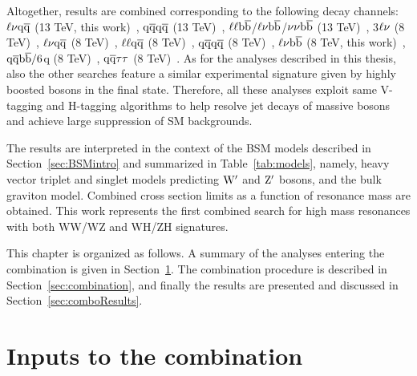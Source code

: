 Altogether, results are combined corresponding to the following decay channels: $\ell \nu \mathrm{q}\overline{\mathrm{q}}$ (13 TeV, this work)~\cite{CMS-PAS-EXO-15-002}, $\mathrm{q}\overline{\mathrm{q}} \mathrm{q}\overline{\mathrm{q}}$ (13 TeV)~\cite{CMS-PAS-EXO-15-002},
$\ell \ell {\mathrm{b}\overline{\mathrm{b}}}$/$\ell \nu {\mathrm{b}\overline{\mathrm{b}}}$/$\nu \nu {\mathrm{b}\overline{\mathrm{b}}}$ (13 TeV)~\cite{Khachatryan:2016cfx},
3$\ell\nu$ (8 TeV)~\cite{Khachatryan:2014xja}, 
$\ell \nu \mathrm{q}\overline{\mathrm{q}}$ (8 TeV)~\cite{Khachatryan:2014gha}, $\ell\ell \mathrm{q}\overline{\mathrm{q}}$ (8 TeV)~\cite{Khachatryan:2014gha}, 
$\mathrm{q}\overline{\mathrm{q}} \mathrm{q}\overline{\mathrm{q}}$ (8 TeV)~\cite{Khachatryan:2014hpa}, 
$\ell \nu {\mathrm{b}\overline{\mathrm{b}}}$ (8 TeV, this work)~\cite{Khachatryan:2016yji}, $\mathrm{q}\overline{\mathrm{q}}{\mathrm{b}\overline{\mathrm{b}}}/6$q (8 TeV)~\cite{Khachatryan:2015bma}, 
$\mathrm{q}\overline{\mathrm{q}} \tau\tau $ (8 TeV)~\cite{Khachatryan:2015ywa}.
As for the analyses described in this thesis, also the other searches feature a similar experimental signature given by highly boosted bosons in the final state.
Therefore, all these analyses exploit same V-tagging and H-tagging algorithms to help resolve jet decays of massive bosons and achieve large suppression of SM backgrounds.

The results are interpreted in the context of the BSM models described in Section~\ref{sec:BSMintro} and summarized in Table~\ref{tab:models}, namely, heavy vector triplet and singlet models predicting $\mathrm{W}^\prime$ and $\mathrm{Z}^\prime$ bosons, and the bulk graviton model.
Combined cross section limits as a function of resonance mass are obtained. This work represents the first combined search for high mass resonances with both WW/WZ and WH/ZH signatures.

This chapter is organized as follows.
A summary of the analyses entering the combination is given in Section~\ref{sec:analyses}.
The combination procedure is described in Section~\ref{sec:combination}, and finally the results are presented and discussed in Section~\ref{sec:comboResults}.

\section{Inputs to the combination}\label{sec:analyses}


